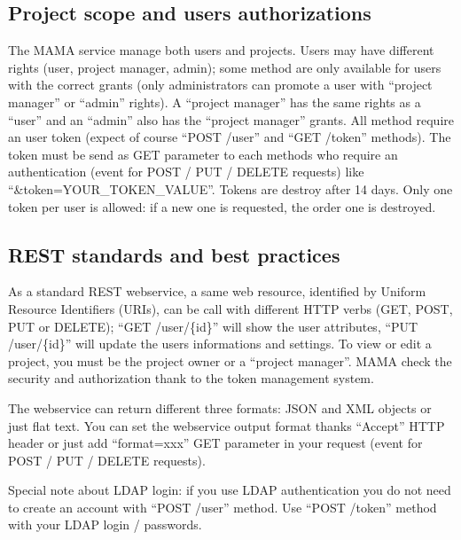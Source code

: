 \subsection{Project scope and users authorizations}
\hspace*{\parindent}
The MAMA service manage both users and projects. 
Users may have different rights (user, project manager, admin);
some method are only available for users with the correct grants 
(\eg only administrators can promote a user with ``project manager'' or ``admin'' rights). 
A ``project manager'' has the same rights as a ``user'' and an ``admin'' also has the ``project manager'' grants. 
All method require an user token (expect of course ``POST /user'' and ``GET /token'' methods). %
The token must be send as GET parameter to each methods who require an authentication 
(event for POST / PUT / DELETE requests) 
like ``\&token=YOUR\_TOKEN\_VALUE''. 
Tokens are destroy after 14 days. 
Only one token per user is allowed: 
if a new one is requested, the order one is destroyed. 
\newline

\subsection{REST standards and best practices}
\hspace*{\parindent}
As a standard REST webservice, a same web resource, identified by Uniform Resource Identifiers (URIs), 
can be call with different HTTP verbs (GET, POST, PUT or DELETE); 
\eg ``GET /user/\{id\}'' will show the user attributes, ``PUT /user/\{id\}'' will update the users informations and settings. 
To view or edit a project, you must be the project owner or a ``project manager''. 
MAMA check the security and authorization thank to the token management system.  
\newline

\hspace*{\parindent}
The webservice can return different three formats: JSON and XML objects or just flat text. 
You can set the webservice output format thanks ``Accept'' HTTP header or just add ``format=xxx'' GET parameter in your request 
(event for POST / PUT / DELETE requests).
\newline

\hspace*{\parindent}
Special note about LDAP login: if you use LDAP authentication you do not need to create an account with ``POST /user'' method. 
Use ``POST /token'' method with your LDAP login / passwords. 

